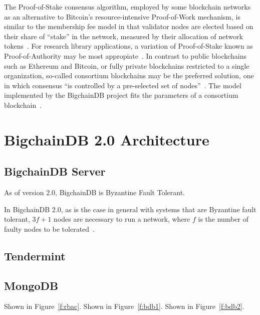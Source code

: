 The Proof-of-Stake consensus algorithm, employed by some blockchain
networks as an alternative to Bitcoin's resource-intensive Proof-of-Work
mechanism, is similar to the membership fee model in that validator nodes
are elected based on their share of ``stake'' in the network, measured by
their allocation of network tokens~\cite{gMarin18}. For research library
applications, a variation of Proof-of-Stake known as Proof-of-Authority may
be most appropiate~\cite{gMarin18, vButerin15}. In contrast to public
blockchains such as Ethereum and Bitcoin, or fully private blockchains
restricted to a single organization, so-called consortium blockchains may be
the preferred solution, one in which consensus ``is controlled by a
pre-selected set of nodes''~\cite{vButerin15}. The model implemented by the
BigchainDB project fits the parameters of a consortium
blockchain~\cite{bdb18b}.

\section{BigchainDB 2.0 Architecture}
\subsection{BigchainDB Server}


As of version 2.0, BigchainDB is Byzantine Fault Tolerant.

﻿In BigchainDB 2.0, as is the case in general with systems that are
Byzantine fault tolerant, $3f + 1$ nodes are necessary to run a network,
where $f$ is the number of faulty nodes to be tolerated~\cite{bdb18}.
\subsection{Tendermint}
\subsection{MongoDB}






Shown in Figure~\ref{f:rbac}. 
Shown in Figure~\ref{f:bdb1}. 
Shown in Figure~\ref{f:bdb2}.


